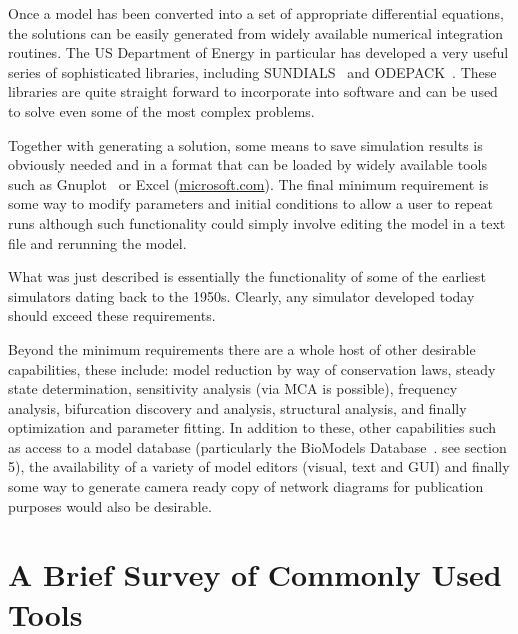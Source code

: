 \documentclass[12pt]{article}
\begin{document}
Once a model has been converted into a set of appropriate
differential equations, the solutions can be easily generated from
widely available numerical integration routines. The US Department of Energy in
particular has developed a very useful series of sophisticated
libraries, including SUNDIALS~\citep{CVODE:2005} and
ODEPACK~\citep{HIND83}. These libraries are quite straight forward to
incorporate into software and can be used to solve even some of the
most complex problems.

Together with generating a solution, some means to save simulation
results is obviously needed and in a format that can be loaded by
widely available tools such as Gnuplot~\citep{williams:1998} or Excel (\url{microsoft.com}). The final minimum
requirement is some way to modify parameters and initial conditions
to allow a user to repeat runs although such functionality could
simply involve editing the model in a text file and rerunning the
model.

What was just described is essentially the functionality of some of
the earliest simulators dating back to the 1950s. Clearly, any
simulator developed today should exceed these requirements.

Beyond the minimum requirements there are a whole host of other
desirable capabilities, these include: model reduction by way of
conservation laws, steady state determination, sensitivity analysis
(via MCA is possible), frequency analysis, bifurcation discovery and
analysis, structural analysis, and finally optimization and
parameter fitting. In addition to these, other capabilities such as
access to a model database (particularly the BioModels Database~\cite{BioModels:2006}. see section 5),
the availability of a variety of model editors (visual, text and
GUI) and finally some way to generate camera ready copy of network
diagrams for publication purposes would also be desirable.

\section{A Brief Survey of Commonly Used Tools}
\end{document}
